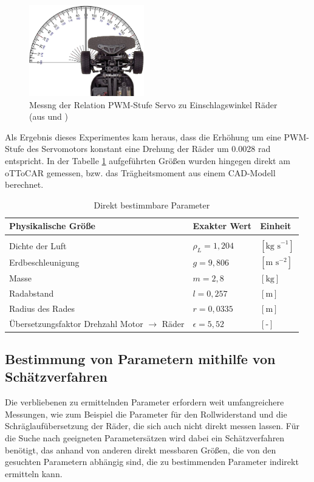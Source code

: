 \begin{figure}[ht]
	\centering
	\includegraphics[width=5cm]{Bilder/u1Messung.png}
	\caption[Messng der Relation PWM-Stufe Servo zu Einschlagswinkel Räder]
		{Messng der Relation PWM-Stufe Servo zu Einschlagswinkel Räder (aus \cite{TT01} und \cite{Wim})}
	\label{pict:u1Mess}
\end{figure}

Als Ergebnis dieses Experimentes kam heraus, dass die Erhöhung um eine PWM-Stufe des Servomotors konstant eine Drehung der Räder um 0.0028 rad entspricht. In der Tabelle \ref{tab:Pardir} aufgeführten Größen wurden hingegen direkt am oTToCAR gemessen, bzw. das Trägheitsmoment aus einem CAD-Modell \cite{TimMar} berechnet. 

\begin{table}[h!]
\centering
\begin{tabularx}{\columnwidth}{m{6cm}|m{4cm}|X}
  \textbf{Physikalische Größe} & \textbf{Exakter Wert}& \textbf{Einheit}\\\hline\hline 
	\rule{0pt}{1mm} & &\\
	Dichte der Luft & $\rho_{L}=1,204$ & $[\text{kg s}^{-1} ]$\\
	Erdbeschleunigung& $g=9,806$ & $[\text{m s}^{-2}]$\\
	Masse& $m=2,8$ & $[\text{kg}]$\\
  	Radabstand& $l=0,257$ & $[\text{m}]$\\
	Radius des Rades & $r=0,0335$ & $[\text{m}]$\\
	Übersetzungsfaktor Drehzahl Motor $\rightarrow$ Räder  & $\epsilon=5,52$ & $[\text{-}]$
\end{tabularx}
\caption{Direkt bestimmbare Parameter \label{tab:Pardir}}
\end{table} 

\subsection{Bestimmung von Parametern mithilfe von Schätzverfahren}
Die verbliebenen zu ermittelnden Parameter erfordern weit umfangreichere Messungen, wie zum Beispiel die Parameter für den Rollwiderstand und die Schräglaufübersetzung der Räder, die sich auch nicht direkt messen lassen. Für die Suche nach geeigneten Parametersätzen wird dabei ein Schätzverfahren benötigt, das anhand von anderen direkt messbaren Größen, die von den gesuchten Parametern abhängig sind, die zu bestimmenden Parameter indirekt ermitteln kann. 

